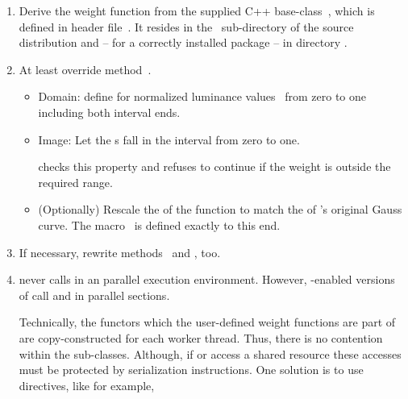\begin{enumerate}
\item
  \begin{sloppypar}
    Derive the weight function from the supplied C++ base-class~, which is
    defined in header file~.  It resides in the
    ~sub-directory of the source distribution and -- for a correctly installed
    package -- in directory .
  \end{sloppypar}

\item
  At least override method~.

  \begin{itemize}
  \item
    Domain: define  for normalized luminance values~ from zero to one
    including both interval ends.

  \item
    Image: Let the s fall in the interval from zero to one.

    \App{} checks this property and refuses to continue if the weight is outside the required
    range.

  \item
    (Optionally) Rescale the  of the function to match the  of
    \App{}'s original Gauss curve.  The macro~ is defined exactly to this
    end.
  \end{itemize}

\item
  If necessary, rewrite methods~ and , too.

\item

  \App{} never calls  in an  parallel execution environment.
  However, -enabled versions of \App{} call  and 
  in parallel sections.

  Technically, the functors which the user-defined weight functions are part of are
  copy-constructed for each  worker thread.  Thus, there is no contention within
  the  sub-classes.  Although, if  or  access
  a shared resource these accesses must be protected by serialization instructions.  One
  solution is to use  directives, like for example,


\end{enumerate}
